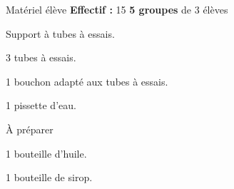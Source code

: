 
\begin{boiteMateriel}{Matériel élève}
  \textbf{Effectif :} 15
  \qq{}\qq{}
  \flecheLongue \textbf{5 groupes} de 3 élèves
  
  \begin{protocole}
    \item Support à tubes à essais.
    \item 3 tubes à essais.
    \item 1 bouchon adapté aux tubes à essais.
    \item 1 pissette d'eau.
  \end{protocole}
\end{boiteMateriel}


\begin{boiteMateriel}{À préparer}
  \begin{protocole}
    \item 1 bouteille d'huile.
    \item 1 bouteille de sirop.
  \end{protocole}
\end{boiteMateriel}